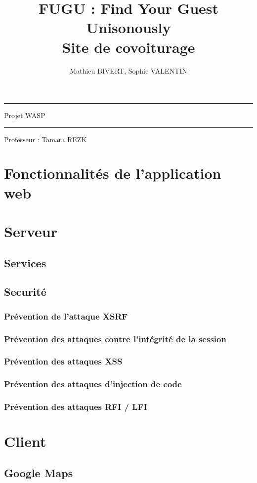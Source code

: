 \documentclass[a4paper]{article}
\title{FUGU : Find Your Guest Unisonously\\Site de covoiturage}
\author{Mathieu BIVERT, Sophie VALENTIN}
\makeatletter
\def\maketitle{%
  \null
  \thispagestyle{empty}%
  \vskip 1cm
  \begin{center}
        \normalfont\large\huge\@author
  \end{center}
  \vfil
  \vfil
  \vfil
  \vfil
  \vfil
  \vfil
  \vfil
  \vfil
  \vfil
  \vfil
  \vfil
  \vfil  
  \vfil  
  \hrule height 2pt
  \par
  \begin{center}
        \huge \strut Projet WASP\\
        \@title \par
  \end{center}
  \hrule height 2pt
  \par
  \vfil
  \vfil
  \vfil
  \vfil
  \vfil
  \vfil
  \vfil
  \vfil  
  \vfil
  \vfil
  \vfil
  \vfil  
  \vfil  
  \vfil
  \vfil  
  \vfil  
  \vfil
  \vfil
  \vfil
  \vfil
  \vfil
  \vfil
  \begin{center}
  			\huge Professeur : Tamara REZK
  \end{center}
  \null
\cleardoublepage
}
\makeatother
\begin{document}
\maketitle

\newpage
\tableofcontents

\newpage

\section{Fonctionnalités de l'application web}

\section{Serveur}

	\subsection{Services}
	\subsection{Securité}
 		\subsubsection{Prévention de l'attaque XSRF}
 		\subsubsection{Prévention des attaques contre l'intégrité de la session}
 		\subsubsection{Prévention des attaques XSS}
		\subsubsection{Prévention des attaques d'injection de code}
		\subsubsection{Prévention des attaques RFI / LFI}
 		
\section{Client}

	\subsection{Google Maps}
\end{document}
